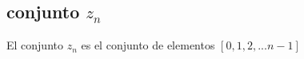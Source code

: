 \subsection{conjunto $z_{n}$}
El conjunto $z_{n}$ es el conjunto de elementos $[0 , 1, 2, . . . n-1]$
